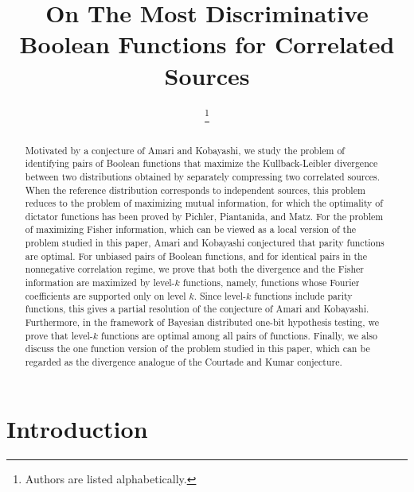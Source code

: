 \documentclass[journal,draftcls, onecolumn]{IEEEtran}
\begin{document}
\title{On The Most Discriminative Boolean Functions for Correlated Sources}

\author{
\thanks{Authors are listed alphabetically.}
}


\maketitle
\begin{abstract}
Motivated by a conjecture of Amari and Kobayashi, we study the problem of
identifying pairs of Boolean functions that maximize the Kullback-Leibler divergence
between two distributions obtained by separately compressing two correlated sources.
When the reference distribution corresponds to independent sources, this problem reduces
to the problem of maximizing mutual information, for which the optimality of dictator functions 
has been proved by Pichler, Piantanida, and Matz. For the problem of maximizing Fisher information,
which can be viewed as a local version of the problem studied in this paper, Amari and Kobayashi
conjectured that parity functions are optimal. 
For unbiased pairs of Boolean functions, and for identical pairs in the nonnegative correlation regime, 
we prove that both the divergence and the Fisher information are
maximized by level-$k$ functions, namely,
functions whose Fourier coefficients are supported only on level $k$. 
Since level-$k$ functions include parity functions, this gives a partial resolution of the conjecture of
Amari and Kobayashi. 
Furthermore, in the framework of Bayesian distributed one-bit hypothesis testing,
we prove that level-$k$ functions are optimal among all pairs of functions. 
Finally, we also discuss the one function version of the problem studied in this paper,
which can be regarded as the divergence analogue of the Courtade and Kumar conjecture. 
\end{abstract}


\section{Introduction}
\end{document}
